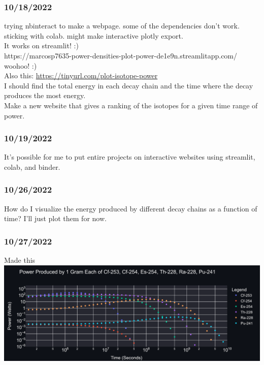 \documentclass[12pt]{article}
\begin{document}
\subsubsection{10/18/2022}
trying nbinteract to make a webpage. some of the dependencies don't work. sticking with colab. might make interactive plotly export. \\
It works on streamlit! :) \\
https://marcosp7635-power-densities-plot-power-de1e9n.streamlitapp.com/\\
woohoo! :)\\
Also this: \href{https://tinyurl.com/plot-isotope-power}{https://tinyurl.com/plot-isotope-power}\\
I should find the total energy in each decay chain and the time where the decay produces the most energy. \\
Make a new website that gives a ranking of the isotopes for a given time range of power. 
\subsubsection{10/19/2022}
It's possible for me to put entire projects on interactive websites using streamlit, colab, and binder.\\
\subsubsection{10/26/2022}
How do I visualize the energy produced by different decay chains as a function of time? I'll just plot them for now. 
\subsubsection{10/27/2022}
Made this \\
\includegraphics[scale=.6]{Images/example_plot.PNG}
\end{document}
